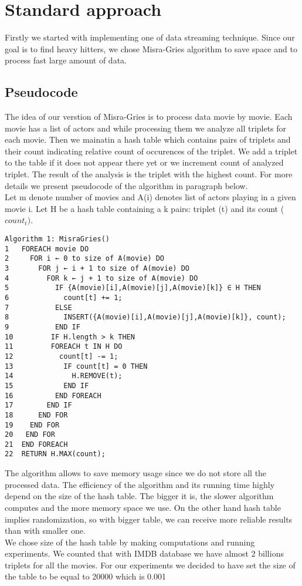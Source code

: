 \label{Standard}
\section{Standard approach}

Firstly we started with implementing one of data streaming technique. Since our goal is to find heavy hitters, we chose Misra-Gries algorithm to save space and to process fast large amount of data.

\label{MisraGries}
\subsection{Pseudocode}
The idea of our verstion of Misra-Gries is to process data movie by movie. Each movie has a list of actors and while processing them we analyze all triplets for each movie. Then we mainatin a hash table which contains pairs of triplets and their count indicating relative count of occurences of the triplet. We add a triplet to the table if it does not appear there yet or we increment count of analyzed triplet. The result of the analysis is the triplet with the highest count. For more details we present pseudocode of the algorithm in paragraph below.
\\
Let m denote number of movies and A(i) denotes list of actors playing in a given movie i. 
Let H be a hash table containing a k pairs: triplet (t) and its count (\(count_t)\).
\begin{verbatim}
Algorithm 1: MisraGries()
1	FOREACH movie DO
2	  FOR i ← 0 to size of A(movie) DO
3	    FOR j ← i + 1 to size of A(movie) DO
4	      FOR k ← j + 1 to size of A(movie) DO
5	        IF {A(movie)[i],A(movie)[j],A(movie)[k]} ∈ H THEN
6	          count[t] += 1;
7	        ELSE
8	          INSERT({A(movie)[i],A(movie)[j],A(movie)[k]}, count);  
9	        END IF
10	       IF H.length > k THEN
11	       FOREACH t IN H DO
12	         count[t] -= 1;
13	          IF count[t] = 0 THEN
14	            H.REMOVE(t);
15	          END IF
16	        END FOREACH
17	      END IF      
18	    END FOR
19	  END FOR
20	 END FOR
21	END FOREACH
22	RETURN H.MAX(count);	  	                    	  
\end{verbatim}

The algorithm allows to save memory usage since we do not store all the processed data. The efficiency of the algorithm and its running time highly depend on the size of the hash table. The bigger it is, the slower algorithm computes and the more memory space we use. On the other hand hash table implies randomization, so with bigger table, we can receive more reliable results than with smaller one.
\\
We chose size of the hash table by making computations and running experiments. We counted that with IMDB database we have almost 2 billions triplets for all the movies. For our experiments we decided to have set the size of the table to be equal to 20000 which is 0.001%

